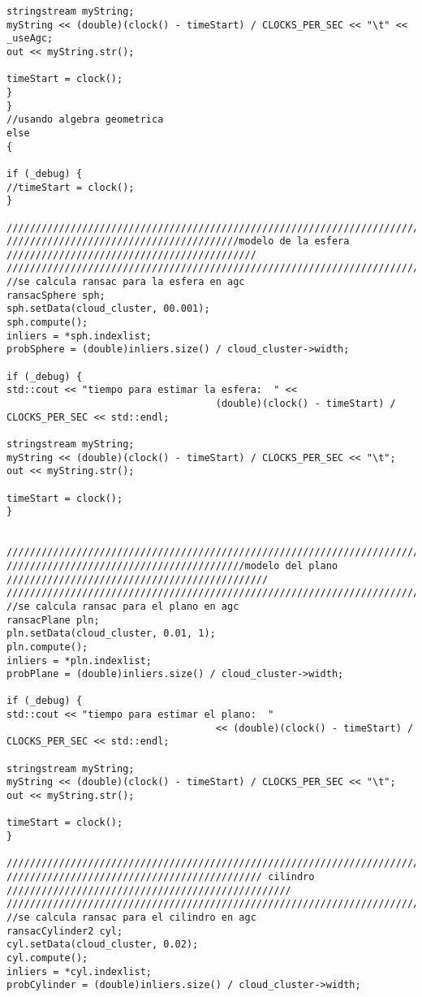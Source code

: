 {\begin{lstlisting}[caption={Archivo test.cpp}]
stringstream myString;
myString << (double)(clock() - timeStart) / CLOCKS_PER_SEC << "\t" << _useAgc;
out << myString.str();

timeStart = clock();
}
}
//usando algebra geometrica
else
{

if (_debug) {
//timeStart = clock();
}

///////////////////////////////////////////////////////////////////////////////////////////////////////
////////////////////////////////////////modelo de la esfera ///////////////////////////////////////////
///////////////////////////////////////////////////////////////////////////////////////////////////////
//se calcula ransac para la esfera en agc
ransacSphere sph;
sph.setData(cloud_cluster, 00.001); 
sph.compute();
inliers = *sph.indexlist;
probSphere = (double)inliers.size() / cloud_cluster->width;

if (_debug) {
std::cout << "tiempo para estimar la esfera:  " << 
									(double)(clock() - timeStart) / CLOCKS_PER_SEC << std::endl;

stringstream myString;
myString << (double)(clock() - timeStart) / CLOCKS_PER_SEC << "\t";
out << myString.str();

timeStart = clock();
}


///////////////////////////////////////////////////////////////////////////////////////////////////////
/////////////////////////////////////////modelo del plano /////////////////////////////////////////////
///////////////////////////////////////////////////////////////////////////////////////////////////////
//se calcula ransac para el plano en agc
ransacPlane pln;
pln.setData(cloud_cluster, 0.01, 1);
pln.compute();
inliers = *pln.indexlist;
probPlane = (double)inliers.size() / cloud_cluster->width;

if (_debug) {
std::cout << "tiempo para estimar el plano:  " 
									<< (double)(clock() - timeStart) / CLOCKS_PER_SEC << std::endl;

stringstream myString;
myString << (double)(clock() - timeStart) / CLOCKS_PER_SEC << "\t";
out << myString.str();

timeStart = clock();
}

///////////////////////////////////////////////////////////////////////////////////////////////////////
//////////////////////////////////////////// cilindro /////////////////////////////////////////////////
///////////////////////////////////////////////////////////////////////////////////////////////////////
//se calcula ransac para el cilindro en agc
ransacCylinder2 cyl;
cyl.setData(cloud_cluster, 0.02);
cyl.compute();
inliers = *cyl.indexlist;
probCylinder = (double)inliers.size() / cloud_cluster->width;


\end{lstlisting}}
